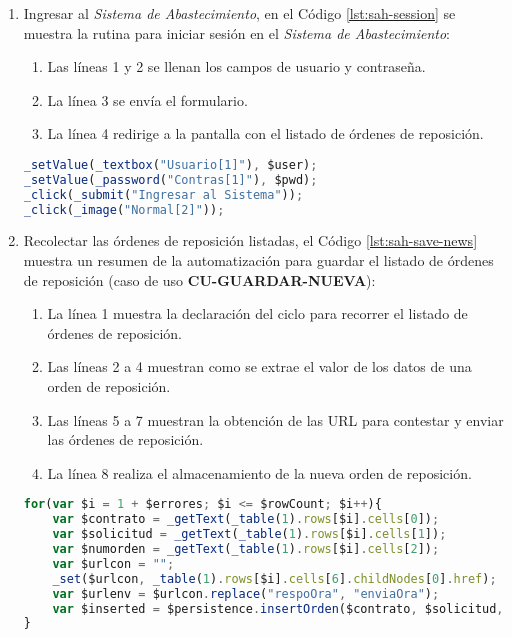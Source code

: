 \begin{enumerate}
	\item Ingresar al \textit{Sistema de Abastecimiento}, en el Código \ref{lst:sah-session} se muestra la rutina para iniciar sesión en el \textit{Sistema de Abastecimiento}:
	\begin{enumerate}
		\item Las líneas 1 y 2 se llenan los campos de usuario y contraseña.
		\item La línea 3 se envía el formulario.
		\item La línea 4 redirige a la pantalla con el listado de órdenes de reposición.  
	\end{enumerate}
	\begin{lstlisting}[language=Javascript, caption={Inicio de sesión en el \textit{Sistema de Abastecimiento}.}, captionpos=b, label={lst:sah-session}]
_setValue(_textbox("Usuario[1]"), $user);
_setValue(_password("Contras[1]"), $pwd);
_click(_submit("Ingresar al Sistema"));
_click(_image("Normal[2]"));
	\end{lstlisting}

	\item Recolectar las órdenes de reposición listadas, el Código \ref{lst:sah-save-news} muestra un resumen de la automatización para guardar el listado de órdenes de reposición (caso de uso \textbf{CU-GUARDAR-NUEVA}):
	\begin{enumerate}
		\item La línea 1 muestra la declaración del ciclo para recorrer el listado de órdenes de reposición.
		\item Las líneas 2 a 4 muestran como se extrae el valor de los datos de una orden de reposición.
		\item Las líneas 5 a 7 muestran la obtención de las URL para contestar y enviar las órdenes de reposición.
		\item La línea 8 realiza el almacenamiento de la nueva orden de reposición. 
	\end{enumerate}
	\begin{lstlisting}[language=Javascript, caption={Guardar lista de órdenes de reposición.}, captionpos=b, label={lst:sah-save-news}]
for(var $i = 1 + $errores; $i <= $rowCount; $i++){
	var $contrato = _getText(_table(1).rows[$i].cells[0]);
	var $solicitud = _getText(_table(1).rows[$i].cells[1]);
	var $numorden = _getText(_table(1).rows[$i].cells[2]);
	var $urlcon = "";
	_set($urlcon, _table(1).rows[$i].cells[6].childNodes[0].href);
	var $urlenv = $urlcon.replace("respoOra", "enviaOra");
	var $inserted = $persistence.insertOrden($contrato, $solicitud, $numorden, $expedicion, $almacen, $urlcon, $urlenv, $idSesion);
}
	\end{lstlisting}


\end{enumerate}
